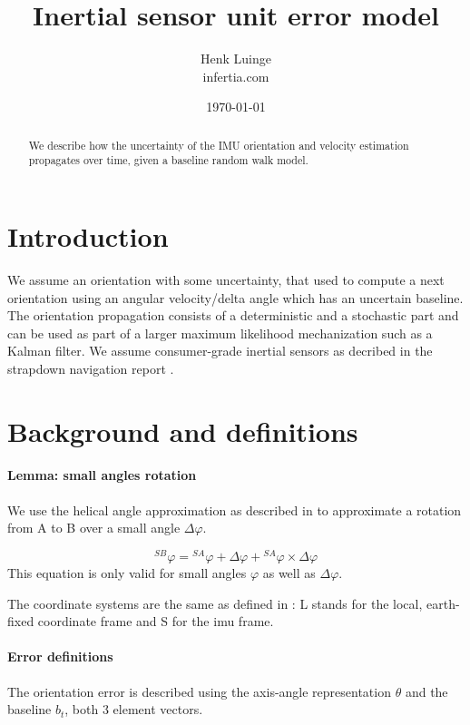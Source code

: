 \documentclass{article}
\title{Inertial sensor unit error model}
\author{Henk Luinge  \\
	infertia.com   \\
	}
\date{\today}
\begin{document}
\maketitle

\begin{abstract}
We describe how the uncertainty of the IMU orientation and velocity estimation propagates over time, given a baseline random walk model.
\end{abstract}

\section{Introduction}

We assume an orientation with some uncertainty, that used to compute a next orientation using an angular velocity/delta angle which has an uncertain baseline. The orientation propagation consists of a deterministic and a stochastic part and can be used as part of a larger maximum likelihood mechanization such as a Kalman filter. We assume consumer-grade inertial sensors as decribed in the strapdown navigation report \cite{Luinge2025}.

\section{Background and definitions}

\paragraph{Lemma: small angles rotation}
We use the helical angle approximation as described in  \cite{Bortz1970} to approximate a rotation from A to B over a small angle $\Delta \varphi$.

\begin{equation} \label{eq:small_angles_orientation_update}
{}^{SB} \varphi = {}^{SA} \varphi + \Delta \varphi + {}^{SA} \varphi \times \Delta \varphi
\end{equation}
This equation is only valid for small angles $\varphi $ as well as $\Delta \varphi$.

The coordinate systems are the same as defined in \cite{Luinge2025}: L stands for the local, earth-fixed coordinate frame and S for the imu frame.




\paragraph{Error definitions}
The orientation error is described using the axis-angle representation $\theta$ and the baseline $b_t$, both 3 element vectors.
\end{document}
